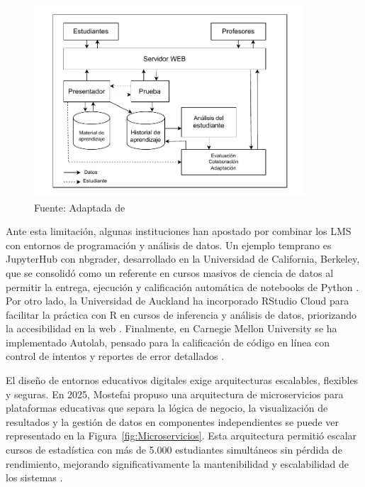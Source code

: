 \documentclass[letter,oneside,12pt,spanish]{report}
\begin{document}
\begin{figure}[ht]
    \centering
    \includegraphics[width=0.9\textwidth]{Figs/Arquitectura_E-learning.pdf}
    \label{fig:architecture_E-learning}
    \\Fuente: Adaptada de \textcite{Mostefai2025}
\end{figure}


Ante esta limitación, algunas instituciones han apostado por combinar los LMS con entornos de programación y análisis de datos. Un ejemplo temprano es JupyterHub con nbgrader, desarrollado en la Universidad de California, Berkeley, que se consolidó como un referente en cursos masivos de ciencia de datos al permitir la entrega, ejecución y calificación automática de notebooks de Python \parencite{berkeley2018}. Por otro lado, la Universidad de Auckland ha incorporado RStudio Cloud para facilitar la práctica con R en cursos de inferencia y análisis de datos, priorizando la accesibilidad en la web \parencite{rubio2023}. Finalmente, en Carnegie Mellon University se ha implementado Autolab, pensado para la calificación de código en línea con control de intentos y reportes de error detallados \parencite{rubio2023}.

El diseño de entornos educativos digitales exige arquitecturas escalables, flexibles y seguras. En 2025, Mostefai propuso una arquitectura de microservicios para plataformas educativas que separa la lógica de negocio, la visualización de resultados y la gestión de datos en componentes independientes se puede ver representado en la Figura~\ref{fig:Microservicios}. Esta arquitectura permitió escalar cursos de estadística con más de 5.000 estudiantes simultáneos sin pérdida de rendimiento, mejorando significativamente la mantenibilidad y escalabilidad de los sistemas \parencite{Mostefai2025}.
\end{document}
